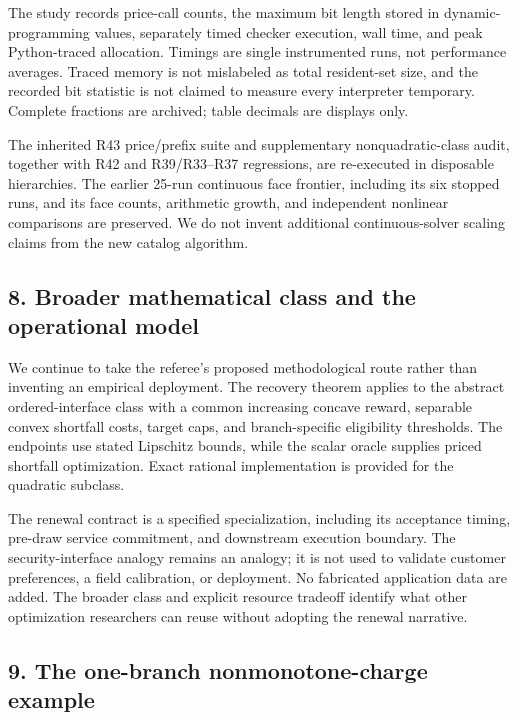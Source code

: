 \documentclass[11pt,letterpaper]{article}
\begin{document}
The study records price-call counts, the maximum bit length stored in dynamic-programming values, separately timed checker execution, wall time, and peak Python-traced allocation. Timings are single instrumented runs, not performance averages. Traced memory is not mislabeled as total resident-set size, and the recorded bit statistic is not claimed to measure every interpreter temporary. Complete fractions are archived; table decimals are displays only.



The inherited R43 price/prefix suite and supplementary nonquadratic-class audit, together with R42 and R39/R33--R37 regressions, are re-executed in disposable hierarchies. The earlier 25-run continuous face frontier, including its six stopped runs, and its face counts, arithmetic growth, and independent nonlinear comparisons are preserved. We do not invent additional continuous-solver scaling claims from the new catalog algorithm.



\subsection*{8. Broader mathematical class and the operational model}


We continue to take the referee's proposed methodological route rather than inventing an empirical deployment. The recovery theorem applies to the abstract ordered-interface class with a common increasing concave reward, separable convex shortfall costs, target caps, and branch-specific eligibility thresholds. The endpoints use stated Lipschitz bounds, while the scalar oracle supplies priced shortfall optimization. Exact rational implementation is provided for the quadratic subclass.



The renewal contract is a specified specialization, including its acceptance timing, pre-draw service commitment, and downstream execution boundary. The security-interface analogy remains an analogy; it is not used to validate customer preferences, a field calibration, or deployment. No fabricated application data are added. The broader class and explicit resource tradeoff identify what other optimization researchers can reuse without adopting the renewal narrative.



\subsection*{9. The one-branch nonmonotone-charge example}
\end{document}
